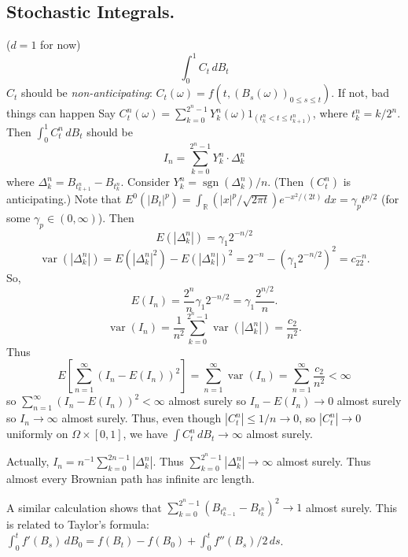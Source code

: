 \documentclass{article}
\newcommand{\R}{\mathbb{R}}
\DeclareMathOperator{\var}{var}
\DeclareMathOperator{\sgn}{sgn}
\theoremstyle{definition}
\begin{document}
\subsection*{Stochastic Integrals.} ($d = 1$ for now)
\[
    \int_0^1 C_t \,dB_t
\]
$C_t$ should be \emph{non-anticipating}: $C_t(\omega) = f(t, (B_s(\omega))_{0 \leq s \leq t})$. If not, bad things can happen Say $C_t^n(\omega) = \sum_{k=0}^{2^n - 1} Y_k^n(\omega)1_{(t_k^n < t \leq t_{k+1}^n)}$, where $t_k^n = k/2^n$. Then $\int_0^1 C_t^n \,dB_t$ should be
\[
    I_n = \sum_{k=0}^{2^n-1} Y_k^n \cdot \Delta_k^n
\]
where $\Delta_k^n = B_{t_{k+1}^n} - B_{t^n_k}$. Consider $Y_k^n = \sgn(\Delta_k^n)/n$. (Then $(C_t^n)$ is anticipating.) Note that $E^0(|B_t|^p) = \int_\R (|x|^p/\sqrt{2\pi t})e^{-x^2/(2t)} \,dx = \gamma_pt^{p/2}$ (for some $\gamma_p \in (0, \infty)$). Then
\[
    E(|\Delta^n_k|) = \gamma_1 2^{-n/2}
\]
\[
    \var(|\Delta^n_k|) = E(|\Delta^n_k|^2) - E(|\Delta^n_k|)^2 = 2^{-n} - (\gamma_1 2^{-n/2})^2 = c_22^{-n}.
\]
So,
\[
    E(I_n) = \frac{2^n}{n}\gamma_1 2^{-n/2} = \gamma_1\frac{2^{n/2}}{n}.
\]
\[
    \var(I_n) = \frac{1}{n^2}\sum_{k=0}^{2^n-1} \var(|\Delta^n_k|) = \frac{c_2}{n^2}.
\]
Thus
\[
    E\left[\sum_{n=1}^\infty (I_n - E(I_n))^2\right] = \sum_{n=1}^\infty \var(I_n) = \sum_{n=1}^\infty \frac{c_2}{n^2} < \infty
\]
so $\sum_{n=1}^\infty (I_n - E(I_n))^2 < \infty$ almost surely so $I_n - E(I_n) \to 0$ almost surely so $I_n \to \infty$ almost surely. Thus, even though $|C^n_t| \leq 1/n \to 0$, so $|C^n_t| \to 0$ uniformly on $\Omega \times [0,1]$, we have $\int C^n_t \,dB_t \to \infty$ almost surely.

Actually, $I_n = n^{-1}\sum_{k=0}^{2n-1} |\Delta^n_k|$. Thus $\sum_{k=0}^{2^n-1} |\Delta^n_k| \to \infty$ almost surely. Thus almost every Brownian path has infinite arc length.

A similar calculation shows that $\sum_{k=0}^{2^n-1} (B_{t^n_{k-1}} - B_{t^n_k})^2 \to 1$ almost surely. This is related to Taylor's formula: $\int_0^t f'(B_s)\,dB_0 = f(B_t) - f(B_0) + \int_0^t f''(B_s)/2 \,ds$.
\end{document}
